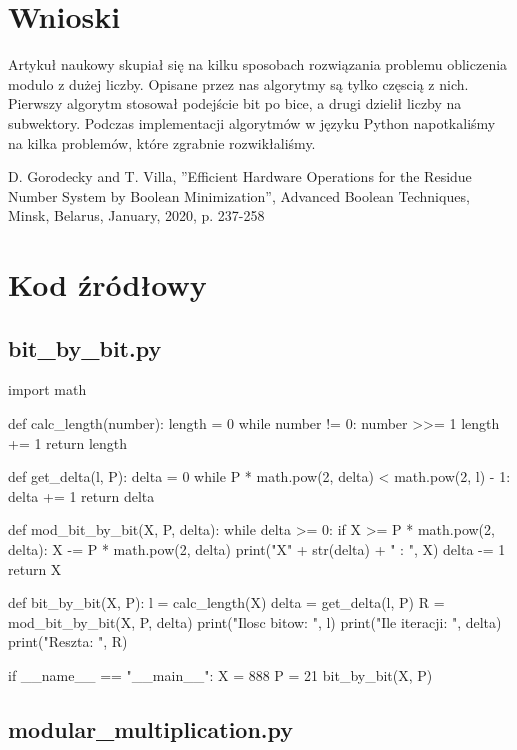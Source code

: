 \documentclass[11pt]{article}
\renewcommand\*{\cdot}
\begin{document}
\section{Wnioski}
Artykuł naukowy skupiał się na kilku sposobach rozwiązania problemu obliczenia modulo z dużej liczby.
Opisane przez nas algorytmy są tylko częscią z nich.
Pierwszy algorytm stosował podejście bit po bice, a drugi dzielił liczby na subwektory.
Podczas implementacji algorytmów w języku Python napotkaliśmy na kilka problemów, które zgrabnie rozwikłaliśmy.
\begin{thebibliography}{9}
    D. Gorodecky and T. Villa, ”Efficient Hardware Operations for the Residue Number
    System by Boolean Minimization”, Advanced Boolean Techniques, Minsk, Belarus,
    January, 2020, p. 237-258
\end{thebibliography}

\newpage
\section{Kod źródłowy}
\subsection{bit\_by\_bit.py}
\begin{python}
    import math


    def calc_length(number):
    length = 0
    while number != 0:
    number >>= 1
    length += 1
    return length


    def get_delta(l, P):
    delta = 0
    while P * math.pow(2, delta) < math.pow(2, l) - 1:
    delta += 1
    return delta


    def mod_bit_by_bit(X, P, delta):
    while delta >= 0:
    if X >= P * math.pow(2, delta):
    X -= P * math.pow(2, delta)
    print("X" + str(delta) + " : ", X)
    delta -= 1
    return X


    def bit_by_bit(X, P):
    l = calc_length(X)
    delta = get_delta(l, P)
    R = mod_bit_by_bit(X, P, delta)
    print("Ilosc bitow: ", l)
    print("Ile iteracji: ", delta)
    print("Reszta: ", R)


    if __name__ == "__main__":
    X = 888
    P = 21
    bit_by_bit(X, P)
\end{python}
\newpage
\subsection{modular\_multiplication.py}
\end{document}
